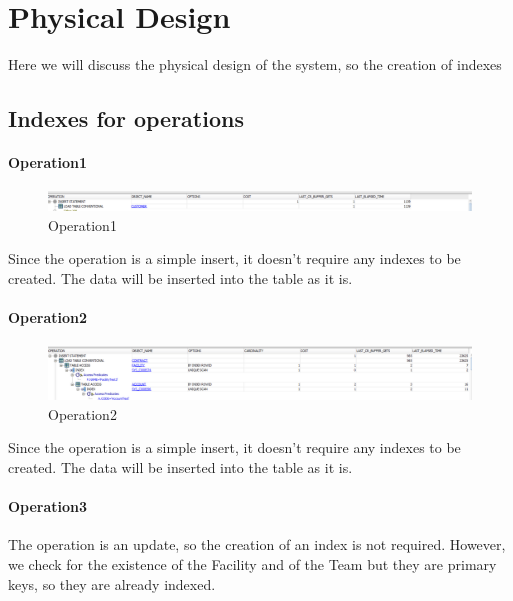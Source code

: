 \section{Physical Design}

Here we will discuss the physical design of the system, so the creation of indexes


\subsection{Indexes for operations}

\paragraph{Operation1} \leavevmode \newline

\begin{figure}[H]
    \centering
    \includegraphics[width=\textwidth]{images/Op1Index.png}
    \caption{Operation1}
\end{figure}

Since the operation is a simple insert, it doesn't require any indexes to be created. The data will be inserted into the table as it is.

\paragraph{Operation2} \leavevmode \newline

\begin{figure}[H]
    \centering
    \includegraphics[width=\textwidth]{images/Op2Index.png}
    \caption{Operation2}
\end{figure}

Since the operation is a simple insert, it doesn't require any indexes to be created. The data will be inserted into the table as it is.

\paragraph{Operation3} \leavevmode \newline
The operation is an update, so the creation of an index is not required. However, we check for the existence of the Facility and of the Team but they are primary keys, so they are already indexed.

